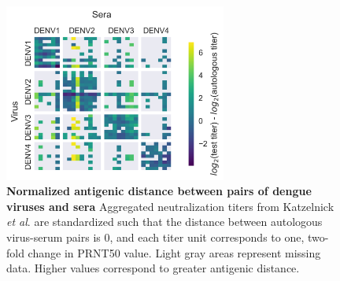\begin{figure}[h!]
\begin{centering}
\includegraphics[width=0.65\textwidth]{./png/titer_heatmap.png}
    \caption[Normalized antigenic distance between pairs of dengue viruses and sera]{\textbf{Normalized antigenic distance between pairs of dengue viruses and sera }
    Aggregated neutralization titers from Katzelnick \textit{et al}. are standardized such that the distance between autologous virus-serum pairs is 0, and each titer unit corresponds to one, two-fold change in PRNT50 value.
    Light gray areas represent missing data.
    Higher values correspond to greater antigenic distance.
    }
     \label{titer_heatmap}
\end{centering}
\end{figure}

